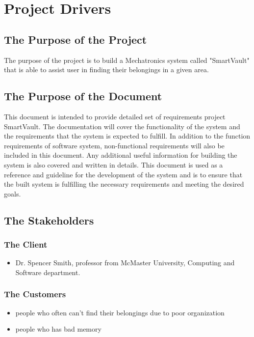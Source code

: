 \documentclass[12pt]{article}
\begin{document}
\section{Project Drivers}

\subsection{The Purpose of the Project}
The purpose of the project is to build a Mechatronics system called "SmartVault" that is able to assist user in finding their belongings in a given area. 
\subsection{The Purpose of the Document}
This document is intended to provide detailed set of requirements project SmartVault. The documentation will cover the functionality of the system and the requirements that the system is expected to fulfill. In addition to the function requirements of software system, non-functional requirements will also be included in this document. Any additional useful information for building the system is also covered and written in details. This document is used as a reference and guideline for the development of the system and is to ensure that the built system is fulfilling the necessary requirements and meeting the desired goals.
\subsection{The Stakeholders}

\subsubsection{The Client}
\begin{itemize}
    \item Dr. Spencer Smith, professor from McMaster University, Computing and Software department. 
\end{itemize}

\subsubsection{The Customers}
\begin{itemize}
    \item people who often can't find their belongings due to poor organization
   	\item people who has bad memory  
\end{itemize}
\end{document}
